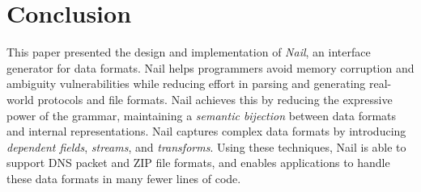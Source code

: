 \section{Conclusion}
\label{s:concl}

This paper presented the design and implementation of \textit{Nail},
an interface generator for data formats.  Nail helps programmers avoid
memory corruption and ambiguity vulnerabilities while reducing effort
in parsing and generating real-world protocols and file formats.
Nail achieves this by reducing the expressive power of the grammar,
maintaining a \emph{semantic bijection} between data formats and internal
representations.  Nail captures complex data formats by introducing
\emph{dependent fields}, \emph{streams}, and \emph{transforms}.
Using these techniques, Nail is able to support DNS packet and ZIP file
formats, and enables applications to handle these data formats in many
fewer lines of code.


